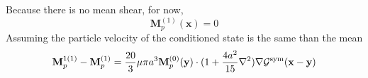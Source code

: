 \documentclass[12pt]{My_preprint}
\begin{document}
Because there is no mean shear, for now, 
\begin{equation}
    \textbf{M}_p^{(1)}(\textbf{x})
    =
    0
\end{equation}
Assuming the particle velocity of the conditioned state is the same than the mean 
\begin{equation}
    \textbf{M}_p^{1(1)} - \textbf{M}_p^{(1)}
    =
    \frac{20}{3} \mu \pi a^3
    \textbf{M}_p^{(0)}(\textbf{y})\cdot
    (1 + \frac{4a^2}{15}\mathbf{\nabla}^2 )\mathbf{\nabla}\mathcal{G}^\text{sym}(\textbf{x}-\textbf{y})
\end{equation}

\citet{jackson2000}
% 

\appendix
\end{document}
